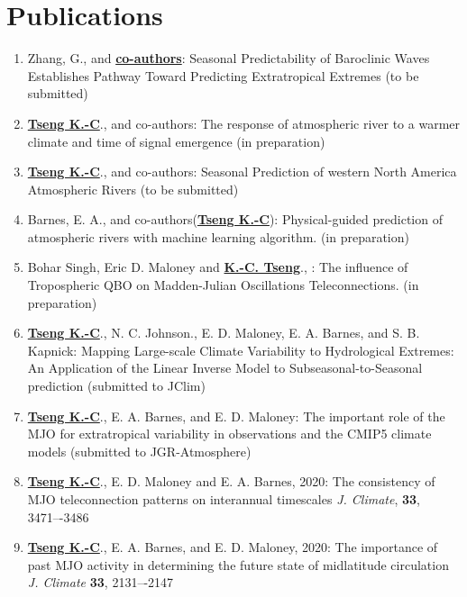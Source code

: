 \documentclass{article}
\begin{document}
\section{\color{airforceblue}Publications}
\begin{enumerate}
	\item Zhang, G., and \normalsize{\bf{\underline{co-authors}}}: Seasonal Predictability of Baroclinic Waves Establishes Pathway Toward Predicting Extratropical Extremes (to be submitted) \par
	\item \normalsize{\bf{\underline{Tseng K.-C}}}., and co-authors: The response of atmospheric river to a warmer climate and time of signal emergence (in preparation) \par
    \item \normalsize{\bf{\underline{Tseng K.-C}}}., and co-authors: Seasonal Prediction of western North America Atmospheric Rivers (to be submitted)\par
	\item Barnes, E. A., and co-authors(\normalsize{\bf{\underline{Tseng K.-C}}}): Physical-guided prediction of atmospheric rivers with machine learning algorithm. (in preparation)  \par
	\item Bohar Singh, Eric D. Maloney and \normalsize{\bf{\underline{K.-C. Tseng}}}., : The influence of Tropospheric QBO on Madden-Julian Oscillations Teleconnections. (in preparation)  \par 
	\item \normalsize{\bf{\underline{Tseng K.-C}}}., N. C. Johnson., E. D. Maloney, E. A. Barnes, and S. B. Kapnick: Mapping Large-scale Climate Variability to Hydrological Extremes: An Application of the Linear Inverse Model to Subseasonal-to-Seasonal prediction (submitted to JClim) 	
	\item \normalsize{\bf{\underline{Tseng K.-C}}}., E. A. Barnes, and E. D. Maloney: The important role of the MJO for extratropical variability in observations and the CMIP5 climate models (submitted to JGR-Atmosphere)   
	\item \normalsize{\bf{\underline{Tseng K.-C}}}., E. D. Maloney and E. A. Barnes, 2020: The consistency of MJO teleconnection patterns on interannual timescales \textit{J. Climate}, \normalsize{\bf{33}}, 3471–-3486
	\item \normalsize{\bf{\underline{Tseng K.-C}}}., E. A. Barnes, and E. D. Maloney, 2020: The importance of past MJO activity in determining the future state of midlatitude circulation  \textit{J. Climate} \normalsize{\bf{33}}, 2131–-2147

\end{enumerate}
\end{document}
